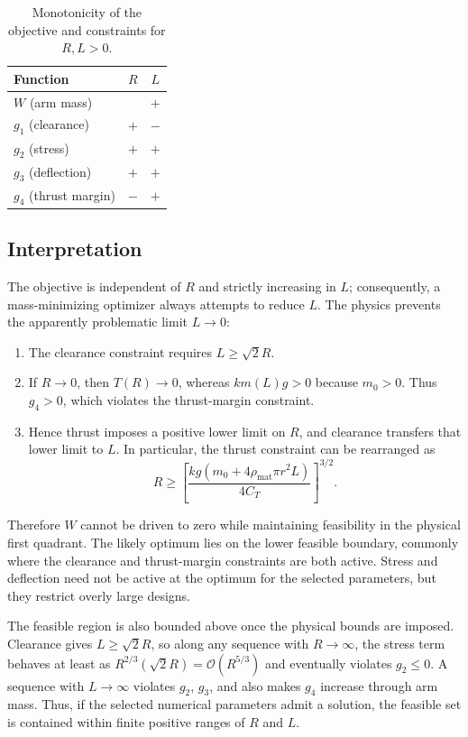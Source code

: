 \documentclass[11pt]{article}
\begin{document}
\begin{table}[h]
\centering
\caption{Monotonicity of the objective and constraints for $R,L>0$.}
\label{tab:monotonicity}
\begin{tabular}{lcc}
\toprule
Function & $R$ & $L$ \\
\midrule
$W$ (arm mass) & & $+$ \\
$g_1$ (clearance) & $+$ & $-$ \\
$g_2$ (stress) & $+$ & $+$ \\
$g_3$ (deflection) & $+$ & $+$ \\
$g_4$ (thrust margin) & $-$ & $+$ \\
\bottomrule
\end{tabular}
\end{table}

\subsection{Interpretation}
The objective is independent of $R$ and strictly increasing in $L$; consequently, a mass-minimizing optimizer always attempts to reduce $L$. The physics prevents the apparently problematic limit $L\to0$:
\begin{enumerate}
 \item The clearance constraint requires $L\geq\sqrt{2}R$.
 \item If $R\to0$, then $T(R)\to0$, whereas $k m(L)g>0$ because $m_0>0$. Thus $g_4>0$, which violates the thrust-margin constraint.
 \item Hence thrust imposes a positive lower limit on $R$, and clearance transfers that lower limit to $L$. In particular, the thrust constraint can be rearranged as
 \begin{equation}
 R\geq\left[\frac{kg\left(m_0+4\rho_{\mathrm{mat}}\pi r^2L\right)}{4C_T}\right]^{3/2}.
 \end{equation}
\end{enumerate}
Therefore $W$ cannot be driven to zero while maintaining feasibility in the physical first quadrant. The likely optimum lies on the lower feasible boundary, commonly where the clearance and thrust-margin constraints are both active. Stress and deflection need not be active at the optimum for the selected parameters, but they restrict overly large designs.

The feasible region is also bounded above once the physical bounds are imposed. Clearance gives $L\geq\sqrt{2}R$, so along any sequence with $R\to\infty$, the stress term behaves at least as $R^{2/3}(\sqrt{2}R)=\mathcal{O}(R^{5/3})$ and eventually violates $g_2\leq0$. A sequence with $L\to\infty$ violates $g_2$, $g_3$, and also makes $g_4$ increase through arm mass. Thus, if the selected numerical parameters admit a solution, the feasible set is contained within finite positive ranges of $R$ and $L$.
\end{document}
